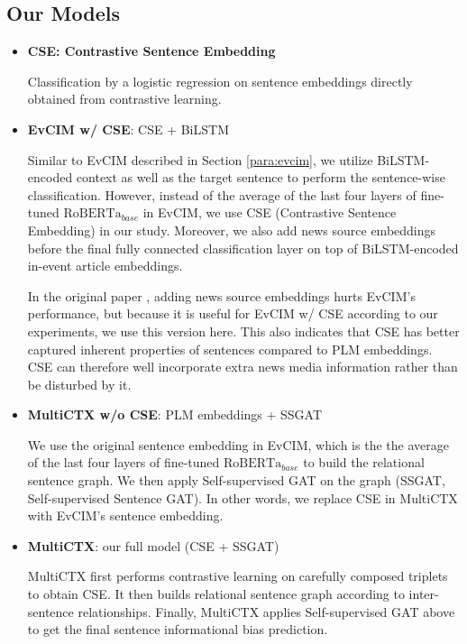 \documentclass[letterpaper]{article} %
\begin{document}
\subsection{Our Models}
\begin{itemize}
    \item \textbf{CSE: Contrastive Sentence Embedding}
    
    Classification by a logistic regression on sentence embeddings directly obtained from contrastive learning.
    
    \item \textbf{EvCIM w/ CSE}: CSE + BiLSTM
    
    Similar to EvCIM described in Section \ref{para:evcim}, we utilize BiLSTM-encoded context as well as the target sentence to perform the sentence-wise classification. However, instead of the average of the last four layers of fine-tuned $\text{RoBERTa}_{base}$ in EvCIM, we use CSE (Contrastive Sentence Embedding) in our study. Moreover, we also add news source embeddings before the final fully connected classification layer on top of BiLSTM-encoded in-event article embeddings. 
    
    In the original paper \citep{cohan-etal-2019-pretrained}, adding news source embeddings hurts EvCIM's performance, but because it is useful for EvCIM w/ CSE according to our experiments, we use this version here. This also indicates that CSE has better captured inherent properties of sentences compared to PLM embeddings. CSE can therefore well incorporate extra news media information rather than be disturbed by it.
    
    \item \textbf{MultiCTX w/o CSE}: PLM embeddings + SSGAT
    
    We use the original sentence embedding in EvCIM, which is the
    the average of the last four layers of fine-tuned $\text{RoBERTa}_{base}$ to build the relational sentence graph. We then apply Self-supervised GAT on the graph (SSGAT, Self-supervised Sentence GAT). In other words, we replace CSE in MultiCTX with EvCIM's sentence embedding.
    
    \item \textbf{MultiCTX}: our full model (CSE + SSGAT)
    
    MultiCTX first performs contrastive learning on carefully composed triplets to obtain CSE. It then builds relational sentence graph according to inter-sentence relationships. Finally, MultiCTX applies Self-supervised GAT above to get the final sentence informational bias prediction.
    
    
\end{itemize}
\end{document}
